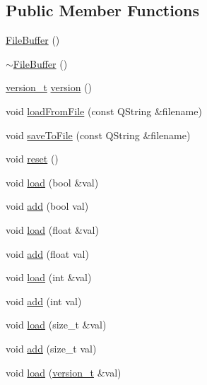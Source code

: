 \subsection*{Public Member Functions}
\begin{DoxyCompactItemize}
\item 
\hyperlink{classShipCADGeometry_1_1FileBuffer_ab243cfcb8a68ce791103594e974ee9ba}{File\-Buffer} ()
\item 
\hyperlink{classShipCADGeometry_1_1FileBuffer_ac92d5e7d145ea18fc6a3a6a18c788ebb}{$\sim$\-File\-Buffer} ()
\item 
\hyperlink{namespaceShipCADGeometry_aa8b61644e46115e9d63667f213045e97}{version\-\_\-t} \hyperlink{classShipCADGeometry_1_1FileBuffer_ace63be89e9b23f3ea9a1e93001314d42}{version} ()
\item 
void \hyperlink{classShipCADGeometry_1_1FileBuffer_a7d5d6ac5aa85545999186f4745a77093}{load\-From\-File} (const Q\-String \&filename)
\item 
void \hyperlink{classShipCADGeometry_1_1FileBuffer_a175d7a153228b5cba5db062a2afd5026}{save\-To\-File} (const Q\-String \&filename)
\item 
void \hyperlink{classShipCADGeometry_1_1FileBuffer_af59c26297994b38aabc4bc678d04c246}{reset} ()
\item 
void \hyperlink{classShipCADGeometry_1_1FileBuffer_ad1aebcc97e364569934c66eec5a87485}{load} (bool \&val)
\item 
void \hyperlink{classShipCADGeometry_1_1FileBuffer_a7cb4395eae7ffa405290c3bed9890bee}{add} (bool val)
\item 
void \hyperlink{classShipCADGeometry_1_1FileBuffer_a525306d68a017ef67ec13c3e8901a8ff}{load} (float \&val)
\item 
void \hyperlink{classShipCADGeometry_1_1FileBuffer_a7909794ac33ad5f695bb670940db99ba}{add} (float val)
\item 
void \hyperlink{classShipCADGeometry_1_1FileBuffer_a557fd80268788313b97149797dc710f8}{load} (int \&val)
\item 
void \hyperlink{classShipCADGeometry_1_1FileBuffer_a475ac244828b4ec9bf6e19f1d65e9443}{add} (int val)
\item 
void \hyperlink{classShipCADGeometry_1_1FileBuffer_a10729a5ec1869b76101e52db5a0e3ea7}{load} (size\-\_\-t \&val)
\item 
void \hyperlink{classShipCADGeometry_1_1FileBuffer_aa22983fa24559f6d0d119d89036100af}{add} (size\-\_\-t val)
\item 
void \hyperlink{classShipCADGeometry_1_1FileBuffer_a20977e9b9504c3c5f4cb32adf9ef4659}{load} (\hyperlink{namespaceShipCADGeometry_aa8b61644e46115e9d63667f213045e97}{version\-\_\-t} \&val)

\end{DoxyCompactItemize}
